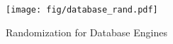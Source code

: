 


\begin{figure}[ht]
    \centering
    \texttt{[image: fig/database\_rand.pdf]}
    \vspace{-1em}
     \caption{Randomization for Database Engines}
     \vspace{-1em}
     \label{fig:database_rand}
\end{figure}


